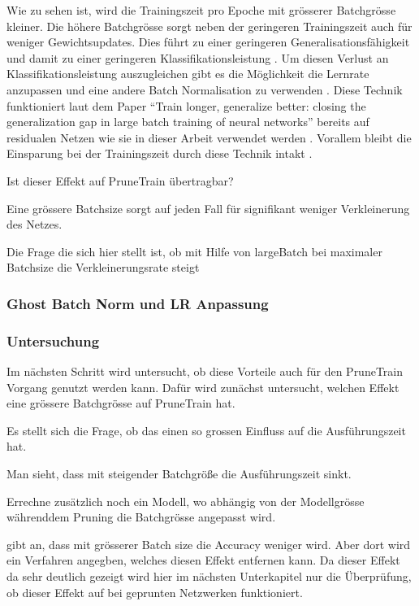 Wie zu sehen ist, wird die Trainingszeit pro Epoche mit grösserer Batchgrösse kleiner. Die höhere Batchgrösse sorgt neben der geringeren Trainingszeit auch für weniger Gewichtsupdates. Dies führt zu einer geringeren Generalisationsfähigkeit und damit zu einer geringeren Klassifikationsleistung \cite{largeBatch}. Um diesen Verlust an Klassifikationsleistung auszugleichen gibt es die Möglichkeit die Lernrate anzupassen und eine andere Batch Normalisation zu verwenden \cite{largeBatch}. Diese Technik funktioniert laut dem Paper "`Train longer, generalize better: closing the generalization gap in large batch training of neural networks"' bereits auf residualen Netzen wie sie in dieser Arbeit verwendet werden \cite{largeBatch}. Vorallem bleibt die Einsparung bei der Trainingszeit durch diese Technik intakt \cite{largeBatch}.

Ist dieser Effekt auf PruneTrain übertragbar?


Eine grössere Batchsize sorgt auf jeden Fall für signifikant weniger Verkleinerung des Netzes.

Die Frage die sich hier stellt ist, ob mit Hilfe von largeBatch bei maximaler Batchsize die Verkleinerungsrate steigt  


\subsubsection{Ghost Batch Norm und LR Anpassung}

\subsubsection{Untersuchung}
Im nächsten Schritt wird untersucht, ob diese Vorteile auch für den PruneTrain Vorgang genutzt werden kann. Dafür wird zunächst untersucht, welchen Effekt eine grössere Batchgrösse auf PruneTrain hat.




Es stellt sich die Frage, ob das einen so grossen Einfluss auf die Ausführungszeit hat.



Man sieht, dass mit steigender Batchgröße die Ausführungszeit sinkt. 

Errechne zusätzlich noch ein Modell, wo abhängig von der Modellgrösse währenddem Pruning die Batchgrösse angepasst wird.



\cite{largeBatch} gibt an, dass mit grösserer Batch size die Accuracy weniger wird. Aber dort wird ein Verfahren angegben, welches diesen Effekt entfernen kann.
Da dieser Effekt da sehr deutlich gezeigt wird hier im nächsten Unterkapitel nur die Überprüfung, ob dieser Effekt auf bei geprunten Netzwerken funktioniert.
